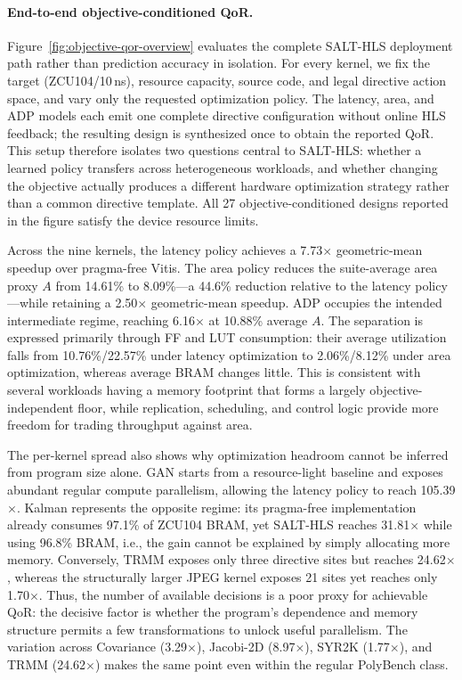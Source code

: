 \paragraph{End-to-end objective-conditioned QoR.}
Figure~\ref{fig:objective-qor-overview} evaluates the complete
SALT-HLS deployment path rather than prediction accuracy in
isolation. For every kernel, we fix the target (ZCU104/10\,ns),
resource capacity, source code, and legal directive action space,
and vary only the requested optimization policy. The latency, area,
and ADP models each emit one complete directive configuration
without online HLS feedback; the resulting design is synthesized
once to obtain the reported QoR. This setup therefore isolates two
questions central to SALT-HLS: whether a learned policy transfers
across heterogeneous workloads, and whether changing the objective
actually produces a different hardware optimization strategy rather
than a common directive template. All 27 objective-conditioned
designs reported in the figure satisfy the device resource limits.

Across the nine kernels, the latency policy achieves a
7.73$\times$ geometric-mean speedup over pragma-free Vitis.
The area policy reduces the suite-average area proxy $A$ from
14.61\% to 8.09\%---a 44.6\% reduction relative to the
latency policy---while retaining a 2.50$\times$ geometric-mean
speedup. ADP occupies the intended intermediate regime, reaching
6.16$\times$ at 10.88\% average $A$. The separation is expressed
primarily through FF and LUT consumption: their average utilization
falls from 10.76\%/22.57\% under latency optimization to
2.06\%/8.12\% under area optimization, whereas average BRAM
changes little. This is consistent with several workloads having a
memory footprint that forms a largely objective-independent floor,
while replication, scheduling, and control logic provide more freedom
for trading throughput against area.

The per-kernel spread also shows why optimization headroom cannot be
inferred from program size alone. GAN starts from a resource-light
baseline and exposes abundant regular compute parallelism, allowing
the latency policy to reach 105.39$\times$. Kalman represents the
opposite regime: its pragma-free implementation already consumes
97.1\% of ZCU104 BRAM, yet SALT-HLS reaches 31.81$\times$ while
using 96.8\% BRAM, i.e., the gain cannot be explained by simply
allocating more memory. Conversely, TRMM exposes only three directive
sites but reaches 24.62$\times$, whereas the structurally larger JPEG
kernel exposes 21 sites yet reaches only 1.70$\times$. Thus, the
number of available decisions is a poor proxy for achievable QoR:
the decisive factor is whether the program's dependence and memory
structure permits a few transformations to unlock useful parallelism.
The variation across Covariance (3.29$\times$), Jacobi-2D
(8.97$\times$), SYR2K (1.77$\times$), and TRMM
(24.62$\times$) makes the same point even within the regular
PolyBench class.

